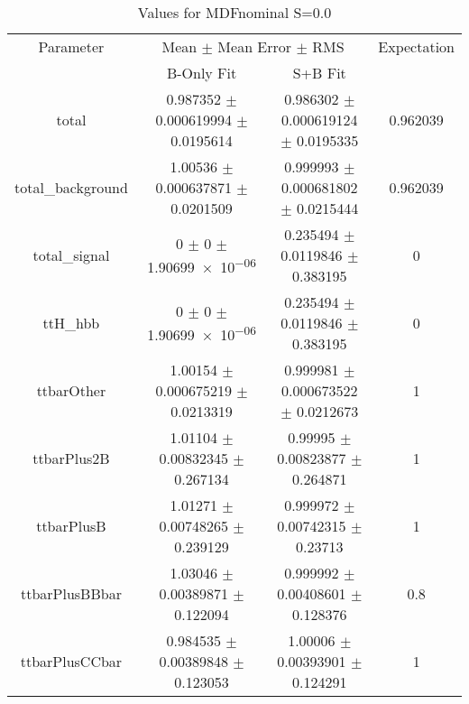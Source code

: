 \begin{table}
\centering
\caption{Values for MDFnominal S=0.0}
\begin{tabular}{cccc}
\toprule
Parameter & \multicolumn{2}{c}{Mean $\pm$ Mean Error $\pm$ RMS} & Expectation\\
 & B-Only Fit & S+B Fit & \\
\midrule
total & \num{0.987352} $\pm$ \num{0.000619994} $\pm$ \num{0.0195614} & \num{0.986302} $\pm$ \num{0.000619124} $\pm$ \num{0.0195335} & \num{0.962039}\\
total\_background & \num{1.00536} $\pm$ \num{0.000637871} $\pm$ \num{0.0201509} & \num{0.999993} $\pm$ \num{0.000681802} $\pm$ \num{0.0215444} & \num{0.962039}\\
total\_signal & \num{0} $\pm$ \num{0} $\pm$ \num{1.90699e-06} & \num{0.235494} $\pm$ \num{0.0119846} $\pm$ \num{0.383195} & \num{0}\\
ttH\_hbb & \num{0} $\pm$ \num{0} $\pm$ \num{1.90699e-06} & \num{0.235494} $\pm$ \num{0.0119846} $\pm$ \num{0.383195} & \num{0}\\
ttbarOther & \num{1.00154} $\pm$ \num{0.000675219} $\pm$ \num{0.0213319} & \num{0.999981} $\pm$ \num{0.000673522} $\pm$ \num{0.0212673} & \num{1}\\
ttbarPlus2B & \num{1.01104} $\pm$ \num{0.00832345} $\pm$ \num{0.267134} & \num{0.99995} $\pm$ \num{0.00823877} $\pm$ \num{0.264871} & \num{1}\\
ttbarPlusB & \num{1.01271} $\pm$ \num{0.00748265} $\pm$ \num{0.239129} & \num{0.999972} $\pm$ \num{0.00742315} $\pm$ \num{0.23713} & \num{1}\\
ttbarPlusBBbar & \num{1.03046} $\pm$ \num{0.00389871} $\pm$ \num{0.122094} & \num{0.999992} $\pm$ \num{0.00408601} $\pm$ \num{0.128376} & \num{0.8}\\
ttbarPlusCCbar & \num{0.984535} $\pm$ \num{0.00389848} $\pm$ \num{0.123053} & \num{1.00006} $\pm$ \num{0.00393901} $\pm$ \num{0.124291} & \num{1}\\
\bottomrule
\end{tabular}
\end{table}